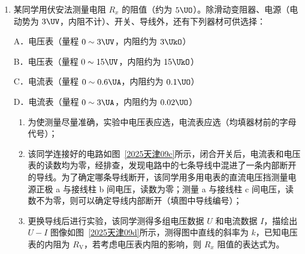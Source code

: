 \documentclass[\gkver]{gaokaozhenti}
\begin{document}
\begin{enumerate}
{（2）水平方向，钢球做匀速直线运动，所以位移随时间均匀增大，即图线甲为水平位移随时间变化的图线，此次钢球做平抛运动的初速度为
$v = \frac{0.3}{0.15} \Ums = 2 \Ums$
}

\item
某同学用伏安法测量电阻 $R_{x}$ 的阻值（约为 $5 \UO$）。除滑动变阻器、电源（电动势为 $3 \UV$，内阻不计）、开关、导线外，还有下列器材可供选择：

A．电压表（量程 $0 \sim 3 \UV$，内阻约为 $3 \UkO$）

B．电压表（量程 $0 \sim 15 \UV$，内阻约为 $15 \UkO$）

C．电流表（量程 $0 \sim 0.6 \UA$，内阻约为 $0.1 \UO$）

D．电流表（量程 $0 \sim 3 \UA$，内阻约为 $0.02 \UO$）

\begin{enumerate}
\item
为使测量尽量准确，实验中电压表应选，电流表应选（均填器材前的字母代号）；
\item
该同学连接好的电路如图~\ref{2025天津09c}所示，闭合开关后，电流表和电压表的读数均为零，经排查，发现电路中的七条导线中混进了一条内部断开的导线。为了确定哪条导线断开，该同学用多用电表的直流电压挡测量电源正极 a 与接线柱 b 间电压，读数为零；测量 a 与接线柱 c 间电压，读数不为零，则可以确定导线内部断开（填图中导线编号）；
\item
更换导线后进行实验，该同学测得多组电压数据 $U$ 和电流数据 $I$，描绘出 $U-I$ 图像如图~\ref{2025天津09d}所示，测得图中直线的斜率为 $k$，已知电压表的内阻为 $R_{\mathrm{V}}$，若考虑电压表内阻的影响，则 $R_{x}$ 阻值的表达式为。
\end{enumerate}


\end{enumerate}
\end{document}
